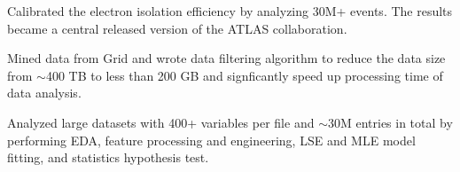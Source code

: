 \documentclass[letterpaper]{deedy-resume-openfont}
\begin{document}
\begin{tightemize}
\item Calibrated the electron isolation efficiency by analyzing 30M+ events. The results became a central released version of the ATLAS collaboration.
\item Mined data from Grid and wrote data filtering algorithm to reduce the data size from $\sim$400 TB to less than 200 GB and signficantly speed up processing time of data analysis.
\item Analyzed large datasets with 400+ variables per file and $\sim$30M entries in total by performing EDA, feature processing and engineering, LSE and MLE model fitting, and statistics hypothesis test.



\end{tightemize}
\end{document}
